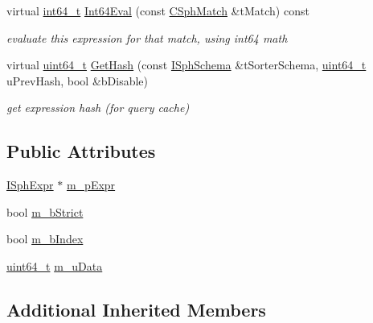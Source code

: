 \begin{DoxyCompactItemize}
virtual \hyperlink{sphinxstd_8h_a996e72f71b11a5bb8b3b7b6936b1516d}{int64\-\_\-t} \hyperlink{structExpr__ForIn__c_a107e29e081b53cf4b2d76010f8633634}{Int64\-Eval} (const \hyperlink{classCSphMatch}{C\-Sph\-Match} \&t\-Match) const 
\begin{DoxyCompactList}\small\item\em evaluate this expression for that match, using int64 math \end{DoxyCompactList}\item 
virtual \hyperlink{sphinxstd_8h_aaa5d1cd013383c889537491c3cfd9aad}{uint64\-\_\-t} \hyperlink{structExpr__ForIn__c_a4517efaae0f0f41bcbf50f1c40879e1e}{Get\-Hash} (const \hyperlink{classISphSchema}{I\-Sph\-Schema} \&t\-Sorter\-Schema, \hyperlink{sphinxstd_8h_aaa5d1cd013383c889537491c3cfd9aad}{uint64\-\_\-t} u\-Prev\-Hash, bool \&b\-Disable)
\begin{DoxyCompactList}\small\item\em get expression hash (for query cache) \end{DoxyCompactList}\end{DoxyCompactItemize}
\subsection*{Public Attributes}
\begin{DoxyCompactItemize}
\item 
\hyperlink{structISphExpr}{I\-Sph\-Expr} $\ast$ \hyperlink{structExpr__ForIn__c_aa5e499f0759c25c99066f1d490198655}{m\-\_\-p\-Expr}
\item 
bool \hyperlink{structExpr__ForIn__c_a31b2c081e20fc3b0c7e0d8e44e6bd011}{m\-\_\-b\-Strict}
\item 
bool \hyperlink{structExpr__ForIn__c_ae1fc4fb8be91ec47c1c1f289698d16df}{m\-\_\-b\-Index}
\item 
\hyperlink{sphinxstd_8h_aaa5d1cd013383c889537491c3cfd9aad}{uint64\-\_\-t} \hyperlink{structExpr__ForIn__c_a20725d306bdaa82332ec2a32a54a72f6}{m\-\_\-u\-Data}
\end{DoxyCompactItemize}
\subsection*{Additional Inherited Members}


